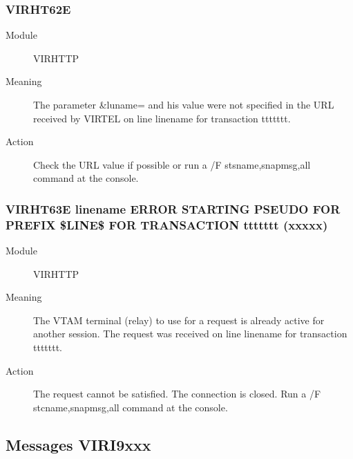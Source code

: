 \documentclass[letterpaper,10pt,english]{sphinxmanual}
\begin{document}
\subsubsection{VIRHT62E}
\label{\detokenize{messages:virht62e}}\begin{description}
\item[{Module}] \leavevmode
VIRHTTP

\item[{Meaning}] \leavevmode
The parameter \&luname= and his value were not specified in the URL received by VIRTEL on line linename for transaction ttttttt.

\item[{Action}] \leavevmode
Check the URL value if possible or run a /F stsname,snapmsg,all command at the console.

\end{description}


\subsubsection{VIRHT63E linename ERROR STARTING PSEUDO FOR PREFIX \$LINE\$ FOR TRANSACTION ttttttt (xxxxx)}
\label{\detokenize{messages:virht63e-linename-error-starting-pseudo-for-prefix-line-for-transaction-ttttttt-xxxxx}}\begin{description}
\item[{Module}] \leavevmode
VIRHTTP

\item[{Meaning}] \leavevmode
The VTAM terminal (relay) to use for a request is already active for another session. The request was received on line linename for transaction ttttttt.

\item[{Action}] \leavevmode
The request cannot be satisfied. The connection is closed. Run a /F stcname,snapmsg,all command at the console.

\end{description}


\subsection{Messages VIRI9xxx}
\label{\detokenize{messages:messages-viri9xxx}}
\end{document}
